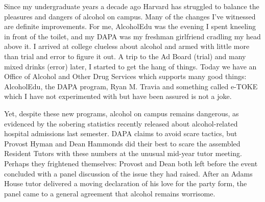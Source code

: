 
Since my undergraduate years a decade ago Harvard has struggled to balance
the pleasures and dangers of alcohol on campus. Many of the changes I've
witnessed are definite improvements. For me, AlcoholEdu was the evening I
spent kneeling in front of the toilet, and my DAPA was my freshman girlfriend
cradling my head above it. I arrived at college clueless about alcohol and
armed with little more than trial and error to figure it out. A trip to the
Ad Board (trial) and many mixed drinks (error) later, I started to get the
hang of things. Today we have an Office of Alcohol and Other Drug Services
which supports many good things: AlcoholEdu, the DAPA program, Ryan M. Travia
and something called e-TOKE which I have not experimented with but have been
assured is not a joke.

Yet, despite these new programs, alcohol on campus remains dangerous, as
evidenced by the sobering statistics recently released about alcohol-related
hospital admissions last semester. DAPA claims to avoid scare tactics, but
Provost Hyman and Dean Hammonds did their best to scare the assembled
Resident Tutors with these numbers at the unusual mid-year tutor meeting.
Perhaps they frightened themselves: Provost and Dean both left before the
event concluded with a panel discussion of the issue they had raised. After
an Adams House tutor delivered a moving declaration of his love for the party
form, the panel came to a general agreement that alcohol remains worrisome.


